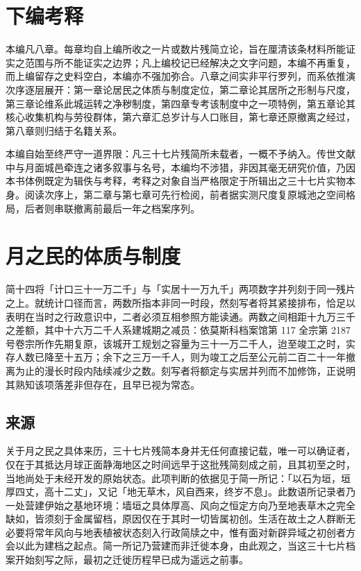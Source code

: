 \chapter*{下编\quad 考释}
\setcounter{chapter}{0}

本编凡八章。每章均自上编所收之一片或数片残简立论，旨在厘清该条材料所能证实之范围与所不能证实之边界；凡上编校记已经解决之文字问题，本编不再重复，而上编留存之史料空白，本编亦不强加弥合。八章之间实非平行罗列，而系依推演次序逐层展开：第一章论居民之体质与制度定位，第二章论其居所之形制与尺度，第三章论维系此城运转之净秽制度，第四章专考该制度中之一项特例，第五章论其核心收集机构与劳役群体，第六章汇总岁计与人口账目，第七章还原撤离之经过，第八章则归结于名籍关系。

本编自始至终严守一道界限：凡三十七片残简所未载者，一概不予纳入。传世文献中与月面城邑牵连之诸多叙事与名号，本编均不涉猎，非因其毫无研究价值，乃因本书体例既定为辑佚与考释，考释之对象自当严格限定于所辑出之三十七片实物本身。阅读次序上，第二章与第七章可先行检阅，前者据实测尺度复原城池之空间格局，后者则串联撤离前最后一年之档案序列。

\chapter{月之民的体质与制度}

简十四将「计口三十一万二千」与「实居十一万九千」两项数字并列刻于同一残片之上。就统计口径而言，两数所指本非同一时段，然刻写者将其紧接排布，恰足以表明在当时之行政意识中，二者必须互相参照方能读通。两数之间相距十九万三千之差额，其中十六万二千人系建城期之减员：依莫斯科档案馆第 117 全宗第 2187 号卷宗所作先期复原，该城开工规划之容量为三十一万二千人，迨至竣工之时，实存人数已降至十五万；余下之三万一千人，则为竣工之后至公元前二百二十一年撤离为止的漫长时段内陆续减少之数。刻写者将额定与实居并列而不加修饰，正说明其熟知该项落差非但存在，且早已视为常态。

\section{来源}

关于月之民之具体来历，三十七片残简本身并无任何直接记载，唯一可以确证者，仅在于其抵达月球正面静海地区之时间远早于这批残简刻成之前，且其初至之时，当地尚处于未经开发的原始状态。此项判断的依据见于简一所记：「以石为垣，垣厚四丈，高十二丈」，又记「地无草木，风自西来，终岁不息」。此数语所记录者乃一处营建伊始之基地环境：墙垣之具体厚高、风向之恒定方向乃至地表草木之完全缺如，皆须刻于金属留档，原因仅在于其时一切皆属初创。生活在故土之人群断无必要将常年风向与地表植被状态刻入行政简牍之中，惟有面对新辟异域之初创者方会以此为建档之起点。简一所记乃营建而非迁徙本身，由此观之，当这三十七片档案开始刻写之际，最初之迁徙历程早已成为遥远之前事。

